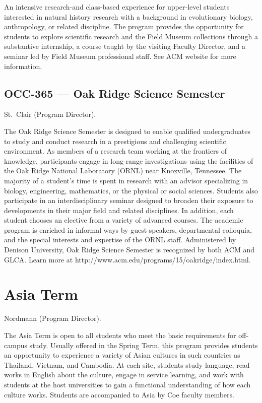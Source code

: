 \documentclass[
  letterpaper,
]{scrbook}
\begin{document}
An intensive research-and class-based experience for upper-level
students interested in natural history research with a background in
evolutionary biology, anthropology, or related discipline. The program
provides the opportunity for students to explore scientific research and
the Field Museum collections through a substantive internship, a course
taught by the visiting Faculty Director, and a seminar led by Field
Museum professional staff. See ACM website for more information.

\subsection{OCC-365 --- Oak Ridge Science
Semester}\label{occ-365-oak-ridge-science-semester}

St.~Clair (Program Director).

The Oak Ridge Science Semester is designed to enable qualified
undergraduates to study and conduct research in a prestigious and
challenging scientific environment. As members of a research team
working at the frontiers of knowledge, participants engage in long-range
investigations using the facilities of the Oak Ridge National Laboratory
(ORNL) near Knoxville, Tennessee. The majority of a student's time is
spent in research with an advisor specializing in biology, engineering,
mathematics, or the physical or social sciences. Students also
participate in an interdisciplinary seminar designed to broaden their
exposure to developments in their major field and related disciplines.
In addition, each student chooses an elective from a variety of advanced
courses. The academic program is enriched in informal ways by guest
speakers, departmental colloquia, and the special interests and
expertise of the ORNL staff. Administered by Denison University, Oak
Ridge Science Semester is recognized by both ACM and GLCA. Learn more at
http://www.acm.edu/programs/15/oakridge/index.html.

\section{Asia Term}\label{asia-term}

Nordmann (Program Director).

The Asia Term is open to all students who meet the basic requirements
for off-campus study. Usually offered in the Spring Term, this program
provides students an opportunity to experience a variety of Asian
cultures in such countries as Thailand, Vietnam, and Cambodia. At each
site, students study language, read works in English about the culture,
engage in service learning, and work with students at the host
universities to gain a functional understanding of how each culture
works. Students are accompanied to Asia by Coe faculty members.
\end{document}
